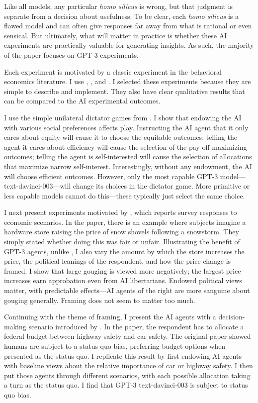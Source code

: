 \documentclass[11pt]{article}
\begin{document}
Like all models, any particular \emph{homo silicus} is wrong, but that judgment is separate from a decision about usefulness.
To be clear, each \emph{homo silicus} is a flawed model and can often give responses far away from what is rational or even sensical.
But ultimately, what will matter in practice is whether these AI experiments are practically valuable for generating insights.
As such, the majority of the paper focuses on GPT-3 experiments.

Each experiment is motivated by a classic experiment in the behavioral economics literature.
I use \cite{charness2002understanding}, \cite{kahneman1986fairness}, and \cite{samuelson1988status}.
I selected these experiments because they are simple to describe and implement.
They also have clear qualitative results that can be compared to the AI experimental outcomes.

I use the simple unilateral dictator games from \cite{charness2002understanding}.
I show that endowing the AI with various social preferences affects play.
Instructing the AI agent that it only cares about equity will cause it to choose the equitable outcomes; telling the agent it cares about efficiency will cause the selection of the pay-off maximizing outcomes; telling the agent is self-interested will cause the selection of allocations that maximize narrow self-interest.
Interestingly, without any endowment, the AI will choose efficient outcomes.
However, only the most capable GPT-3 model---text-davinci-003---will change its choices in the dictator game.
More primitive or less capable models cannot do this---these typically just select the same choice. 

I next present experiments motivated by \cite{kahneman1986fairness}, which reports survey responses to economic scenarios.
In the paper, there is an example where subjects imagine a hardware store raising the price of snow shovels following a snowstorm.
They simply stated whether doing this was fair or unfair.
Illustrating the benefit of GPT-3 agents, unlike \cite{kahneman1986fairness}, I also vary the amount by which the store increases the price, the political leanings of the respondent, and how the price change is framed. 
I show that large gouging is viewed more negatively; the largest price increases earn approbation even from AI libertarians.
Endowed political views matter, with predictable effects---AI agents of the right are more sanguine about gouging generally.
Framing does not seem to matter too much. 

Continuing with the theme of framing, I present the AI agents with a decision-making scenario introduced by \cite{samuelson1988status}.
In the paper, the respondent has to allocate a federal budget between highway safety and car safety.
The original paper showed humans are subject to a status quo bias, preferring budget options when presented as the status quo.
I replicate this result by first endowing AI agents with baseline views about the relative importance of car or highway safety. 
I then put those agents through different scenarios, with each possible allocation taking a turn as the status quo.
I find that GPT-3 text-davinci-003 is subject to status quo bias. 
\end{document}
